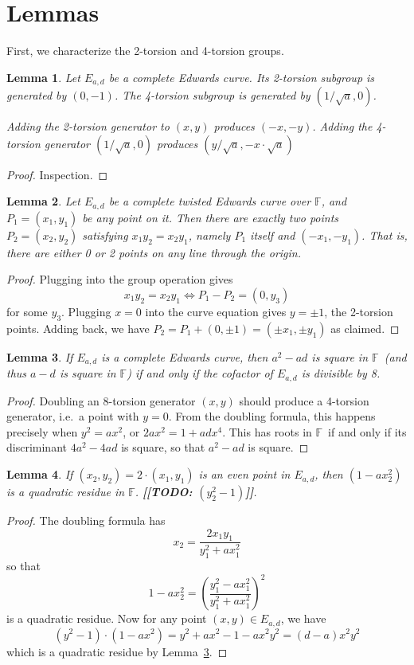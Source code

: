 \documentclass[11pt]{article}
\newtheorem{lemma}{Lemma}
\newcommand\todo[1]{\textbf{[[TODO: #1]]}\xspace}
\def\F{\ensuremath{\mathbb{F}}}
\begin{document}
\section{Lemmas}
First, we characterize the 2-torsion and 4-torsion groups.\\
\begin{lemma}\label{lemma:tors}
Let $E_{a,d}$ be a complete Edwards curve.  Its 2-torsion subgroup is generated by $(0,-1)$.  The 4-torsion subgroup is generated by $(1/\sqrt{a},0)$.

Adding the 2-torsion generator to $(x,y)$ produces $(-x,-y)$.  Adding the 4-torsion generator $(1/\sqrt{a},0)$ produces $(y/\sqrt{a},-x\cdot\sqrt{a})$
\end{lemma}
\begin{proof}
Inspection.
\end{proof}

\begin{lemma}\label{lemma:line}
Let $E_{a,d}$ be a complete twisted Edwards curve over \F, and $P_1 = (x_1,y_1)$ be any point on it.  Then there are exactly two points $P_2 = (x_2,y_2)$ satisfying $x_1 y_2 = x_2 y_1$, namely $P_1$ itself and $(-x_1,-y_1)$.  That is, there are either 0 or 2 points on any line through the origin.
\end{lemma}
\begin{proof}
Plugging into the group operation gives
$$x_1 y_2 = x_2 y_1 \Longleftrightarrow P_1-P_2 = (0,y_3)$$
for some $y_3$.  Plugging $x=0$ into the curve equation gives $y=\pm1$, the 2-torsion points.  Adding back, we have $P_2 = P_1 + (0,\pm1) = (\pm x_1, \pm y_1)$ as claimed.
\end{proof}

\begin{lemma}\label{lemma:dma}
If $E_{a,d}$ is a complete Edwards curve, then $a^2-ad$ is square in \F\ (and thus $a-d$ is square in \F) if and only if the cofactor of $E_{a,d}$ is divisible by 8.
\end{lemma}
\begin{proof}
Doubling an 8-torsion generator $(x,y)$ should produce a 4-torsion generator, i.e.\ a point with $y=0$.  From the doubling formula, this happens precisely when $y^2=ax^2$, or $2ax^2=1+adx^4$.  This has roots in \F\ if and only if its discriminant $4a^2-4ad$ is square, so that $a^2-ad$ is square.
\end{proof}

\begin{lemma}\label{lemma:sqrt}
If $(x_2,y_2) = 2\cdot(x_1,y_1)$ is an even point in $E_{a,d}$, then $(1-ax_2^2)$ is a quadratic residue in \F.  \todo{$(y_2^2-1)$}.
\end{lemma}
\begin{proof}
The doubling formula has $$x_2 = \frac{2x_1 y_1}{y_1^2+ax_1^2}$$
so that $$1-ax_2^2 = \left(\frac{y_1^2-ax_1^2}{y_1^2+ax_1^2}\right)^2$$
is a quadratic residue.  Now for any point $(x,y)\in E_{a,d}$, we have
$$(y^2-1)\cdot(1-ax^2)
= y^2+ax^2-1-ax^2y^2
= (d-a)x^2y^2
$$
which is a quadratic residue by Lemma~\ref{lemma:dma}.
\end{proof}
\end{document}
